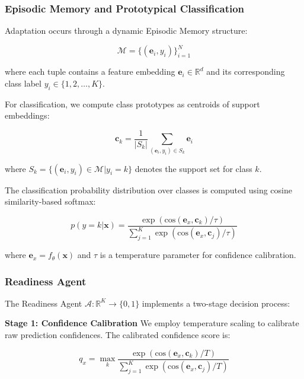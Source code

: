 \documentclass[conference]{IEEEtran}
\begin{document}
\subsubsection{Episodic Memory and Prototypical Classification}

Adaptation occurs through a dynamic Episodic Memory structure:

\begin{equation}
\mathcal{M} = \{(\mathbf{e}_i, y_i)\}_{i=1}^N
\end{equation}

where each tuple contains a feature embedding $\mathbf{e}_i \in \mathbb{R}^d$ and its corresponding class label $y_i \in \{1, 2, \ldots, K\}$.

For classification, we compute class prototypes as centroids of support embeddings:

\begin{equation}
\mathbf{c}_k = \frac{1}{|S_k|} \sum_{(\mathbf{e}_i, y_i) \in S_k} \mathbf{e}_i \label{eq:prototype}
\end{equation}

where $S_k = \{(\mathbf{e}_i, y_i) \in \mathcal{M} | y_i = k\}$ denotes the support set for class $k$.

The classification probability distribution over classes is computed using cosine similarity-based softmax:

\begin{equation}
p(y=k|\mathbf{x}) = \frac{\exp(\text{cos}(\mathbf{e}_x, \mathbf{c}_k) / \tau)}{\sum_{j=1}^{K} \exp(\text{cos}(\mathbf{e}_x, \mathbf{c}_j) / \tau)} \label{eq:classification}
\end{equation}

where $\mathbf{e}_x = f_\theta(\mathbf{x})$ and $\tau$ is a temperature parameter for confidence calibration.

\subsubsection{Readiness Agent}

The Readiness Agent $\mathcal{A}: \mathbb{R}^K \rightarrow \{0,1\}$ implements a two-stage decision process:

\textbf{Stage 1: Confidence Calibration}
We employ temperature scaling to calibrate raw prediction confidences. The calibrated confidence score is:

\begin{equation}
q_x = \max_k \frac{\exp(\text{cos}(\mathbf{e}_x, \mathbf{c}_k) / T)}{\sum_{j=1}^{K} \exp(\text{cos}(\mathbf{e}_x, \mathbf{c}_j) / T)} \label{eq:calibration}
\end{equation}
\end{document}
